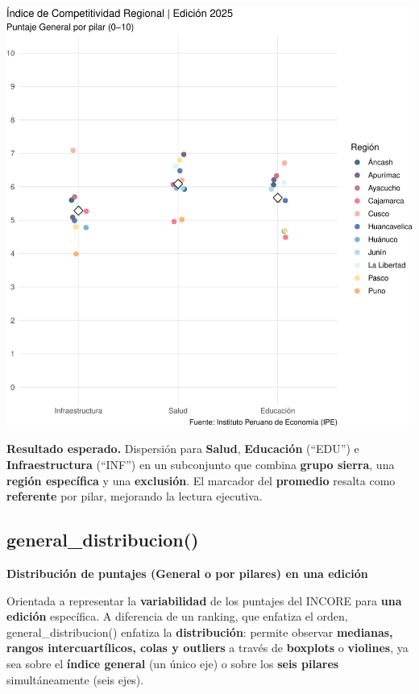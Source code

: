 \documentclass[
  11pt,
  letterpaper,
  DIV=11,
  numbers=noendperiod]{scrartcl}
\begin{document}
\includegraphics{Manual_files/figure-pdf/unnamed-chunk-25-1.pdf}

\textbf{Resultado esperado.} Dispersión para \textbf{Salud},
\textbf{Educación} (``EDU'') e \textbf{Infraestructura} (``INF'') en un
subconjunto que combina \textbf{grupo sierra}, una \textbf{región
específica} y una \textbf{exclusión}. El marcador del \textbf{promedio}
resalta como \textbf{referente} por pilar, mejorando la lectura
ejecutiva.

\subsection{\texorpdfstring{\textbf{general\_distribucion()}}{general\_distribucion()}}\label{general_distribucion}

\textbf{Distribución de puntajes (General o por pilares) en una edición}

Orientada a representar la \textbf{variabilidad} de los puntajes del
INCORE para \textbf{una edición} específica. A diferencia de un ranking,
que enfatiza el orden, general\_distribucion() enfatiza la
\textbf{distribución}: permite observar \textbf{medianas, rangos
intercuartílicos, colas y outliers} a través de \textbf{boxplots} o
\textbf{violines}, ya sea sobre el \textbf{índice general} (un único
eje) o sobre los \textbf{seis pilares} simultáneamente (seis ejes).
\end{document}
